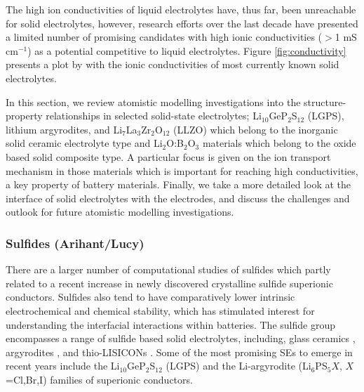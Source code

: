 \documentclass[../main.tex]{subfiles}
\begin{document}
The high ion conductivities of liquid electrolytes have, thus far, been unreachable for solid electrolytes, however, research efforts over the last decade have presented a limited number of promising candidates with high ionic conductivities ($>$1 mS cm$^{-1}$) as a potential competitive to liquid electrolytes.\cite{kanno_synthesis_2000,murayama_synthesis_2002,murayama_material_2004,minafra_influence_2019,bron_li_2013,whiteley_empowering_2014,huang_superionic_2019,yamane_crystal_2007,homma_crystal_2011} Figure \ref{fig:conductivity} presents a plot by \citeauthor{Kamaya2011} with the ionic conductivities of most currently known solid electrolytes.

In this section, we review atomistic modelling investigations into the structure-property relationships in selected solid-state electrolytes; Li$_{10}$GeP$_2$S$_{12}$ (LGPS), lithium argyrodites, and Li$_7$La$_3$Zr$_2$O$_{12}$ (LLZO) which belong to the inorganic solid ceramic electrolyte type and Li$_{2}$O:B$_{2}$O$_{3}$ materials which belong to the oxide based solid composite type. A particular focus is given on the ion transport mechanism in those materials which is important for reaching high conductivities, a key property of battery materials. Finally, we take a more detailed look at the interface of solid electrolytes with the electrodes, and discuss the challenges and outlook for future atomistic modelling investigations.

\subsubsection{Sulfides (Arihant/Lucy)}
There are a larger number of computational studies of sulfides which partly related to a recent increase in newly discovered crystalline sulfide superionic conductors. Sulfides also tend to have comparatively lower intrinsic electrochemical and chemical stability, which has stimulated interest for understanding the interfacial interactions within batteries. \cite{Xiao2020interfacerev} The sulfide group encompasses a range of sulfide based solid electrolytes, including, glass ceramics \cite{minami2006recent}, argyrodites \cite{bai2020research}, and thio-LISICONs \cite{minafra2020two}. Some of the most promising SEs to emerge in recent years include the Li$_{10}$GeP$_2$S$_{12}$ (LGPS) \cite{Bhandari2016,Kamaya2011,Mo2012} and the Li-argyrodite (Li$_6$PS$_{5}X$, $X$=Cl,Br,I) \cite{kraft2018,deiseroth_li6ps5x_2008,deklerk2016,kraft2017,minafra2018,adeli2019} families of superionic conductors.
\end{document}
